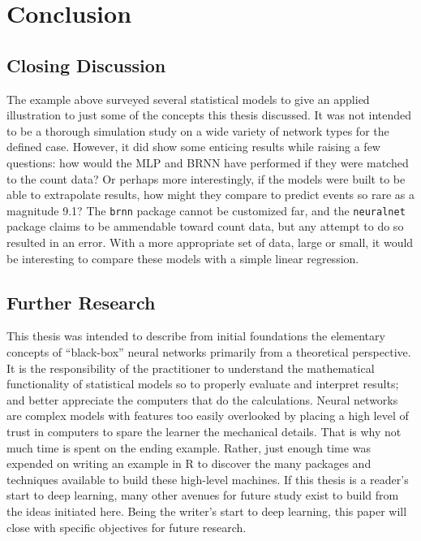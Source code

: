 \chapter{Conclusion}



\section{Closing Discussion}

The example above surveyed several statistical models to give an applied illustration to just some of the concepts this thesis discussed.  It was not intended to be a thorough simulation study on a wide variety of network types for the defined case.  However, it did show some enticing results while raising a few questions: how would the MLP and BRNN have performed if they were matched to the count data?  Or perhaps more interestingly, if the models were built to be able to extrapolate results, how might they compare to predict events so rare as a magnitude 9.1? The \texttt{brnn} package cannot be customized far, and the \texttt{neuralnet} package claims to be ammendable toward count data, but any attempt to do so resulted in an error.  With a more appropriate set of data, large or small, it would be interesting to compare these models with a simple linear regression.


\section{Further Research}

This thesis was intended to describe from initial foundations the elementary concepts of ``black-box'' neural networks primarily from a theoretical perspective. It is the responsibility of the practitioner to understand the mathematical functionality of statistical models so to properly evaluate and interpret results; and better appreciate the computers that do the calculations.  Neural networks are complex models with features too easily overlooked by placing a high level of trust in computers to spare the learner the mechanical details.  That is why not much time is spent on the ending example.  Rather, just enough time was expended on writing an example in R to discover the many packages and techniques available to build these high-level machines.  If this thesis is a reader's start to deep learning, many other avenues for future study exist to build from the ideas initiated here.  Being the writer's start to deep learning, this paper will close with specific objectives for future research.



